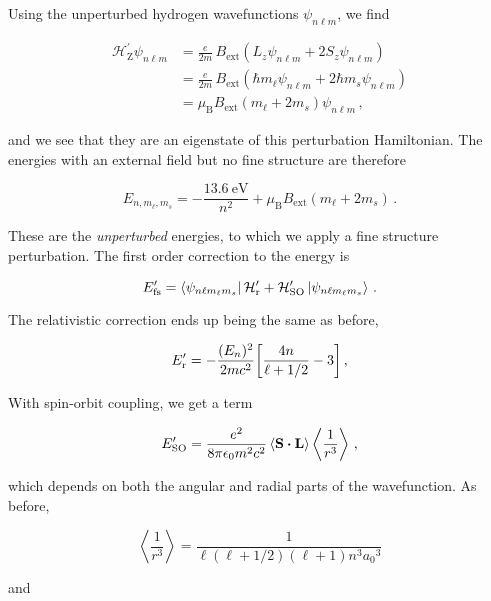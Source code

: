\documentclass[12pt, titlepage]{article}
\newcommand{\exv}[1]{\left\langle #1 \right\rangle}
\begin{document}
Using the unperturbed hydrogen wavefunctions $\psi_{n \ell m}$, we find

\begin{align*}
	\mathcal{H}_\text{Z}^\prime \psi_{n \ell m} &= \frac{e}{2m}\,B_\text{ext}(L_z\psi_{n \ell m} + 2S_z\psi_{n \ell m}) \\[4pt]
	&= \frac{e}{2m}\,B_\text{ext}(\hbar m_\ell\psi_{n \ell m} + 2\hbar m_s\psi_{n \ell m}) \\[4pt]
	&= \mu_\text{B} B_\text{ext} (m_\ell + 2m_s) \psi_{n \ell m} \,,
\end{align*}

and we see that they are an eigenstate of this perturbation Hamiltonian. The energies with an external field but no fine structure are therefore

\begin{equation}
	E_{n, m_{\ell}, m_{s}} = -\frac{\SI{13.6}{\eV}}{n^2} + \mu_\text{B} B_\text{ext}(m_\ell + 2m_s) \,.
\end{equation}

These are the \textit{unperturbed} energies, to which we apply a fine structure perturbation. The first order correction to the energy is

\begin{equation}
	E_\text{fs}^\prime = \bra{\psi_{n \ell m_{\ell} m_{s}}}\mathcal{H}_\text{r}^\prime + \mathcal{H}_\text{SO}^\prime \ket{\psi_{n \ell m_{\ell} m_{s}}} \,.
\end{equation}

The relativistic correction ends up being the same as before,

\begin{equation*}
	E_\text{r}^\prime = -\frac{(E_n)^2}{2mc^2}\qty[\frac{4n}{\ell+1/2}-3] \,,
\end{equation*}

With spin-orbit coupling, we get a term 

\begin{equation*}
	E_\text{SO}^\prime = \frac{e^2}{8\pi\epsilon_0 m^2c^2} \exv{\vb{S}\vdot\vb{L}}\exv{\frac{1}{r^3}} \,,
\end{equation*}

which depends on both the angular and radial parts of the wavefunction. As before, 

\begin{equation*}
	\exv{\frac{1}{r^3}} = \frac{1}{\ell(\ell+1/2)(\ell+1) n^3 {a_0}^3}
\end{equation*}

and 
\end{document}
